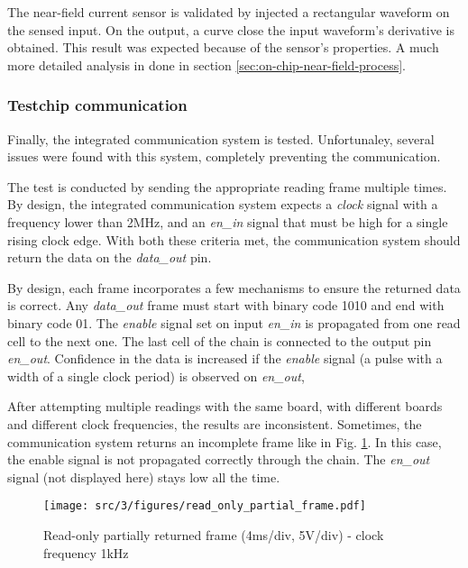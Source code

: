 The near-field current sensor is validated by injected a rectangular waveform on the sensed input.
On the output, a curve close the input waveform's derivative is obtained.
This result was expected because of the sensor's properties.
A much more detailed analysis in done in section \ref{sec:on-chip-near-field-process}.

\subsubsection{Testchip communication}

Finally, the integrated communication system is tested.
Unfortunaley, several issues were found with this system, completely preventing the communication.

The test is conducted by sending the appropriate reading frame multiple times.
By design, the integrated communication system expects a \textit{clock} signal with a frequency lower than 2MHz, and an \textit{en\_in} signal that must be high for a single rising clock edge.
With both these criteria met, the communication system should return the data on the \textit{data\_out} pin.

By design, each frame incorporates a few mechanisms to ensure the returned data is correct.
Any \textit{data\_out} frame must start with binary code 1010 and end with binary code 01.
The \textit{enable} signal set on input \textit{en\_in} is propagated from one read cell to the next one.
The last cell of the chain is connected to the output pin \textit{en\_out}.
Confidence in the data is increased if the \textit{enable} signal (a pulse with a width of a single clock period) is observed on \textit{en\_out},

After attempting multiple readings with the same board, with different boards and different clock frequencies, the results are inconsistent.
Sometimes, the communication system returns an incomplete frame like in Fig. \ref{fig:read-only-partial-frame}.
In this case, the enable signal is not propagated correctly through the chain.
The \textit{en\_out} signal (not displayed here) stays low all the time.

\begin{figure}[!htbp]
  \centering
  \texttt{[image: src/3/figures/read\_only\_partial\_frame.pdf]}
  \caption{Read-only partially returned frame (4ms/div, 5V/div) - clock frequency 1kHz}
  \label{fig:read-only-partial-frame}
\end{figure}

